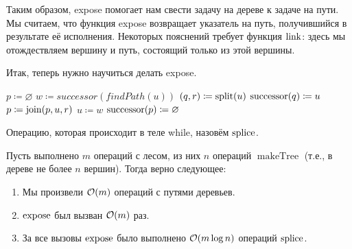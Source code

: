 Таким образом, expose помогает нам свести задачу на дереве к задаче на пути. Мы считаем, что функция expose возвращает указатель на путь, получившийся в результате её исполнения. Некоторых пояснений требует функция $\operatorname{link}$: здесь мы отождествляем вершину и путь, состоящий только из этой вершины.

Итак, теперь нужно научиться делать expose.

\begin{algorithmic}[1]

		\State $p \coloneqq \varnothing$ 
			\State $w \coloneqq successor(findPath(u))$ 
			\State $(q, r) \coloneqq \operatorname{split}(u)$ 
			 
				\State $\operatorname{successor}(q) \coloneqq u$ 
			\EndIf
			\State $p \coloneqq \operatorname{join}(p, u, r)$ 
			\State $u \coloneqq w$ 
		\EndWhile
		\State $\operatorname{successor}(p) \coloneqq \varnothing$
	\EndProcedure

\end{algorithmic}

Операцию, которая происходит в теле while, назовём $\operatorname{splice}$.

\begin{theorem}
Пусть выполнено $m$ операций с лесом, из них $n$ операций $\operatorname{makeTree}$ (т.е., в дереве не более $n$ вершин). Тогда верно следующее:

\begin{enumerate}
    \item Мы произвели $\mathcal{O}(m)$ операций с путями деревьев.
    \item $\operatorname{expose}$ был вызван $\mathcal{O}(m)$ раз.
    \item За все вызовы $\operatorname{expose}$ было выполнено $\mathcal{O}(m \log{n})$ операций $\operatorname{splice}$.
\end{enumerate}
\end{theorem}

